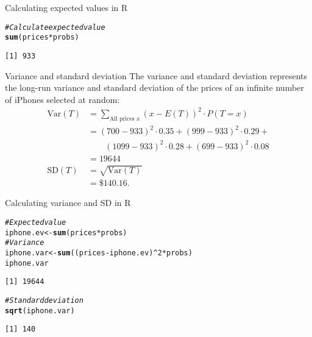 \documentclass{beamer}\usepackage[]{graphicx}\usepackage[]{color}
\makeatletter
\newcommand{\hlnum}[1]{\textcolor[rgb]{0.686,0.059,0.569}{#1}}%
\newcommand{\hlcom}[1]{\textcolor[rgb]{0.678,0.584,0.686}{\textit{#1}}}%
\newcommand{\hlopt}[1]{\textcolor[rgb]{0,0,0}{#1}}%
\newcommand{\hlstd}[1]{\textcolor[rgb]{0.345,0.345,0.345}{#1}}%
\newcommand{\hlkwb}[1]{\textcolor[rgb]{0.69,0.353,0.396}{#1}}%
\newcommand{\hlkwd}[1]{\textcolor[rgb]{0.737,0.353,0.396}{\textbf{#1}}}%
\newenvironment{kframe}{%
 \def\at@end@of@kframe{}%
 \ifinner\ifhmode%
  \def\at@end@of@kframe{\end{minipage}}%
  \begin{minipage}{\columnwidth}%
 \fi\fi%
 \def\FrameCommand##1{\hskip\@totalleftmargin \hskip-\fboxsep
 \colorbox{shadecolor}{##1}\hskip-\fboxsep
     \hskip-\linewidth \hskip-\@totalleftmargin \hskip\columnwidth}%
 \MakeFramed {\advance\hsize-\width
   \@totalleftmargin\z@ \linewidth\hsize
   \@setminipage}}%
 {\par\unskip\endMakeFramed%
 \at@end@of@kframe}
\newenvironment{knitrout}{}{} %
\makeatother
\begin{document}
\begin{darkframes}
\begin{frame}[fragile]{Calculating expected values in R}
\begin{knitrout}
\begin{kframe}
\begin{alltt}
\hlcom{# Calculate expected value}
\hlkwd{sum}\hlstd{(prices} \hlopt{*} \hlstd{probs)}
\end{alltt}
\begin{verbatim}
[1] 933
\end{verbatim}
\end{kframe}
\end{knitrout}
\end{frame}

\begin{frame}{Variance and standard deviation}
  The variance and standard deviation represents the long-run variance and standard deviation of the prices of an infinite number of iPhones selected at random:
  \begin{align*}
    \text{Var}(T) &= \sum_{\text{All prices $x$}} (x - E(T))^2 \cdot P(T=x) \\
    &= (700-933)^2\cdot 0.35 + (999-933)^2\cdot 0.29 + \\
    &\qquad (1099-933)^2\cdot 0.28 + (699-933)^2\cdot 0.08 \\
    &= 19644 \\
    \text{SD}(T) &= \sqrt{\text{Var}(T)} \\
    &= \$140.16.
  \end{align*}
\end{frame}

\begin{frame}[fragile]{Calculating variance and SD in R}
\begin{knitrout}
\color{fgcolor}\begin{kframe}
\begin{alltt}
\hlcom{# Expected value}
\hlstd{iphone.ev} \hlkwb{<-} \hlkwd{sum}\hlstd{(prices} \hlopt{*} \hlstd{probs)}
\hlcom{# Variance}
\hlstd{iphone.var} \hlkwb{<-} \hlkwd{sum}\hlstd{((prices} \hlopt{-} \hlstd{iphone.ev)}\hlopt{^}\hlnum{2} \hlopt{*} \hlstd{probs)}
\hlstd{iphone.var}
\end{alltt}
\begin{verbatim}
[1] 19644
\end{verbatim}
\begin{alltt}
\hlcom{# Standard deviation}
\hlkwd{sqrt}\hlstd{(iphone.var)}
\end{alltt}
\begin{verbatim}
[1] 140
\end{verbatim}
\end{kframe}
\end{knitrout}
\end{frame}


\end{darkframes}
\end{document}
